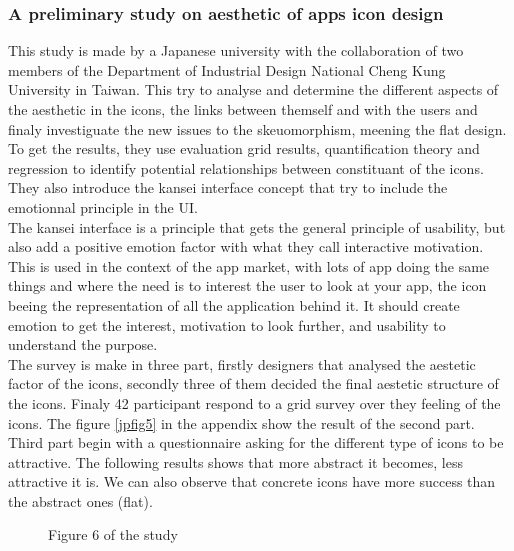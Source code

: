 \documentclass[a4paper,11pt] {article}
\theoremstyle{definition}
\begin{document}
    \subsubsection{A preliminary study on aesthetic of apps icon design\cite{jpAnalitics}}
This study is made by a Japanese university with the collaboration of two members of the Department of Industrial Design National Cheng Kung University in Taiwan. This try to analyse and determine the different aspects of the aesthetic in the icons, the links between themself and with the users and finaly investiguate the new issues to the skeuomorphism, meening the flat design. To get the results, they use evaluation grid results, quantification theory and regression to identify potential relationships between constituant of the icons. They also introduce the kansei interface concept that try to include the emotionnal principle in the UI.
\\
The kansei interface is a principle that gets the general principle of usability, but also add a positive emotion factor with what they call interactive motivation. This is used in the context of the app market, with lots of app doing the same things and where the need is to interest the user to look at your app, the icon beeing the representation of all the application behind it. It should create emotion to get the interest, motivation to look further, and usability to understand the purpose.
\\
The survey is make in three part, firstly designers that analysed the aestetic factor of the icons, secondly three of them decided the final aestetic structure of the icons. Finaly 42 participant respond to a grid survey over they feeling of the icons. The figure \ref{jpfig5} in the appendix show the result of the second part. 
\\
Third part begin with a questionnaire asking for the different type of icons to be attractive. The following results shows that more abstract it becomes, less attractive it is. We can also observe that concrete icons have more success than the abstract ones (flat).
\begin{figure}[H] 
  \caption{Figure 6 of the study}\label{jpfig6}
\end{figure}
\end{document}
